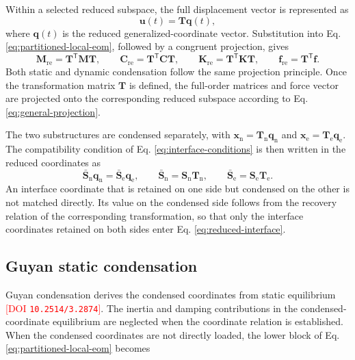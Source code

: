 \documentclass[11pt,a4paper]{article}
\numberwithin{equation}{section}
\newcommand{\rev}[1]{\textcolor{red}{#1}}
\begin{document}
Within a selected reduced subspace, the full displacement vector is represented as
\begin{equation}
	\bm{u}(t)=\mathbf{T}\bm{q}(t),
	\label{eq:general-reduction}
\end{equation}
where \(\bm{q}(t)\) is the reduced generalized-coordinate vector. Substitution into Eq. \eqref{eq:partitioned-local-eom}, followed by a congruent projection, gives
\begin{equation}
	\mathbf{M}_{\mathrm{re}}=\mathbf{T}^{\mathsf{T}}\mathbf{M}\mathbf{T},
	\qquad
	\mathbf{C}_{\mathrm{re}}=\mathbf{T}^{\mathsf{T}}\mathbf{C}\mathbf{T},
	\qquad
	\mathbf{K}_{\mathrm{re}}=\mathbf{T}^{\mathsf{T}}\mathbf{K}\mathbf{T},
	\qquad
	\bm{f}_{\mathrm{re}}=\mathbf{T}^{\mathsf{T}}\bm{f}.
	\label{eq:general-projection}
\end{equation}
Both static and dynamic condensation follow the same projection principle. Once the transformation matrix \(\mathbf{T}\) is defined, the full-order matrices and force vector are projected onto the corresponding reduced subspace according to Eq. \eqref{eq:general-projection}.

The two substructures are condensed separately, with \(\bm{x}_{\mathrm{n}}=\mathbf{T}_{\mathrm{n}}\bm{q}_{\mathrm{n}}\) and \(\bm{x}_{\mathrm{e}}=\mathbf{T}_{\mathrm{e}}\bm{q}_{\mathrm{e}}\). The compatibility condition of Eq. \eqref{eq:interface-conditions} is then written in the reduced coordinates as
\begin{equation}
	\bar{\mathbf{S}}_{\mathrm{n}}\bm{q}_{\mathrm{n}}
	=\bar{\mathbf{S}}_{\mathrm{e}}\bm{q}_{\mathrm{e}},
	\qquad
	\bar{\mathbf{S}}_{\mathrm{n}}=\mathbf{S}_{\mathrm{n}}\mathbf{T}_{\mathrm{n}},
	\qquad
	\bar{\mathbf{S}}_{\mathrm{e}}=\mathbf{S}_{\mathrm{e}}\mathbf{T}_{\mathrm{e}}.
	\label{eq:reduced-interface}
\end{equation}
An interface coordinate that is retained on one side but condensed on the other is not matched directly. Its value on the condensed side follows from the recovery relation of the corresponding transformation, so that only the interface coordinates retained on both sides enter Eq. \eqref{eq:reduced-interface}.




\subsection{Guyan static condensation} \label{sec21}

Guyan condensation derives the condensed coordinates from static equilibrium \cite{Guyan1965}\,\rev{[DOI \nolinkurl{10.2514/3.2874}]}. The inertia and damping contributions in the condensed-coordinate equilibrium are neglected when the coordinate relation is established. When the condensed coordinates are not directly loaded, the lower block of Eq. \eqref{eq:partitioned-local-eom} becomes
\end{document}

